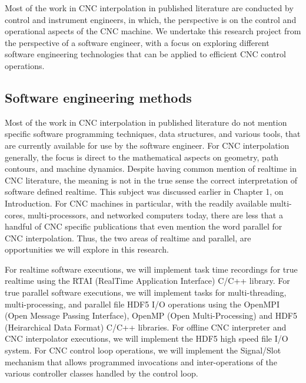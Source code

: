Most of the work in CNC interpolation in published literature are conducted by control and instrument engineers, in which, the perspective is on the control and operational aspects of the CNC machine. We undertake this research project from the perspective of a software engineer, with a focus on exploring different software engineering technologies that can be applied to efficient CNC control operations.  

\subsection{Software engineering methods}

Most of the work in CNC interpolation in published literature do not mention specific software programming techniques, data structures, and various tools, that are currently available for use by the software engineer. For CNC interpolation generally, the focus is direct to the mathematical aspects on geometry, path contours, and machine dynamics. Despite having common mention of realtime in CNC literature, the meaning is not in the true sense the correct interpretation of software defined realtime. This subject was discussed earlier in Chapter 1, on Introduction. For CNC machines in particular, with the  readily available multi-cores, multi-processors, and networked computers today, there are less that a handful of CNC specific publications that even mention the word parallel for CNC interpolation. Thus, the two areas of realtime and parallel, are opportunities we will explore in this research.
\vspace{0.5cm}

For realtime software executions, we will implement task time recordings for true realtime using the RTAI (RealTime Application Interface) C/C++ library. For true parallel software executions, we will implement tasks for multi-threading, multi-processing, and parallel file HDF5 I/O  operations using the OpenMPI (Open Message Passing Interface), OpenMP (Open Multi-Processing) and HDF5 (Heirarchical Data Format) C/C++ libraries. For offline CNC interpreter and CNC interpolator executions, we will implement the HDF5 high speed file I/O system. For CNC control loop operations, we will implement the Signal/Slot mechanism that allows programmed invocations and inter-operations of the various controller classes handled by the control loop.

